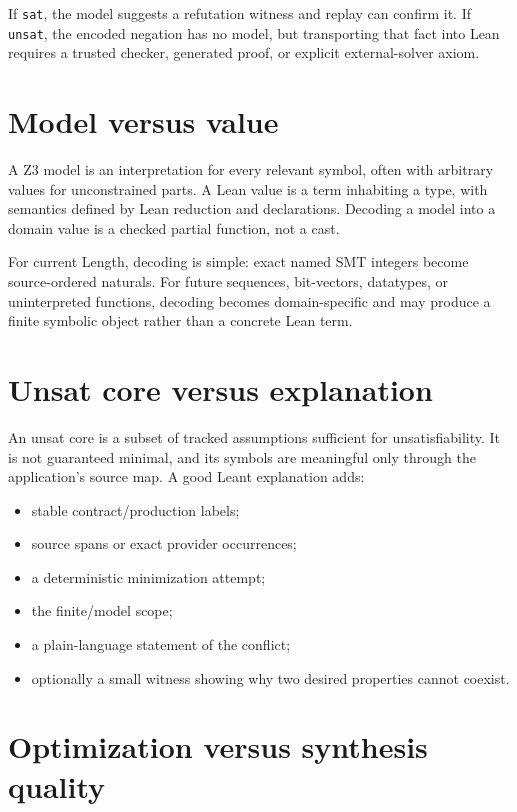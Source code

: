 \documentclass[10pt,letterpaper,oneside]{report}
\newcommand{\sat}{\texttt{sat}}
\newcommand{\unsat}{\texttt{unsat}}
\begin{document}
If \sat{}, the model suggests a refutation witness and replay can confirm it. If \unsat{}, the encoded negation has no model, but transporting that fact into Lean requires a trusted checker, generated proof, or explicit external-solver axiom.

\section{Model versus value}

A Z3 model is an interpretation for every relevant symbol, often with arbitrary values for unconstrained parts. A Lean value is a term inhabiting a type, with semantics defined by Lean reduction and declarations. Decoding a model into a domain value is a checked partial function, not a cast.

For current Length, decoding is simple: exact named SMT integers become source-ordered naturals. For future sequences, bit-vectors, datatypes, or uninterpreted functions, decoding becomes domain-specific and may produce a finite symbolic object rather than a concrete Lean term.

\section{Unsat core versus explanation}

An unsat core is a subset of tracked assumptions sufficient for unsatisfiability. It is not guaranteed minimal, and its symbols are meaningful only through the application's source map. A good Leant explanation adds:

\begin{itemize}
\item stable contract/production labels;
\item source spans or exact provider occurrences;
\item a deterministic minimization attempt;
\item the finite/model scope;
\item a plain-language statement of the conflict;
\item optionally a small witness showing why two desired properties cannot coexist.
\end{itemize}

\section{Optimization versus synthesis quality}
\end{document}
